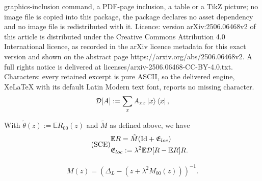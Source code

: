 \documentclass[10pt,a4paper]{amsart}
\def\Expec{{\mathbb E}}
\def\bra#1{\mathinner{\langle{#1}|}}
\def\ket#1{\mathinner{|{#1}\rangle}}
\newcommand{\Id}{{\operatorname*{Id}}}
\begin{document}
graphics-inclusion command, a PDF-page inclusion, a table or a TikZ picture; no image file is copied into this package, the package declares no asset dependency and no image file is redistributed with it. Licence: version arXiv:2506.06468v2 of this article is distributed under the Creative Commons Attribution 4.0 International licence, as recorded in the arXiv licence metadata for this exact version and shown on the abstract page https://arxiv.org/abs/2506.06468v2. A full rights notice is delivered at licenses/arxiv-2506.06468-CC-BY-4.0.txt. Characters: every retained excerpt is pure ASCII, so the delivered engine, XeLaTeX with its default Latin Modern text font, reports no missing character.
\begin{equation}
\label{eq:D-def}
\mathcal{D}[A] := \sum_{x}A_{xx}\ket{x}\bra{x},
\end{equation}

\begin{proposition}
\label{prp:approxSCE}
With $\tilde{\theta}(z) := \Expec R_{00}(z)$ and $\tilde{M}$ as defined above, we have
\begin{equation}\tag*{(SCE)}
\label{eq:appx-sce}
\begin{split}
&\mathbb{E}R = \tilde{M}(\Id+\mathfrak{E}_{\rm loc}) \\
&\mathfrak{E}_{\rm loc} := \lambda^2\mathbb{E}\mathcal{D}[R-\Expec R]R.
\end{split}
\end{equation}
\end{proposition}

\begin{align}
\label{eq:def-of-M}
M(z) = (\Delta_L- (z+\lambda^2M_{00}(z)))^{-1}.
\end{align}
\end{document}
